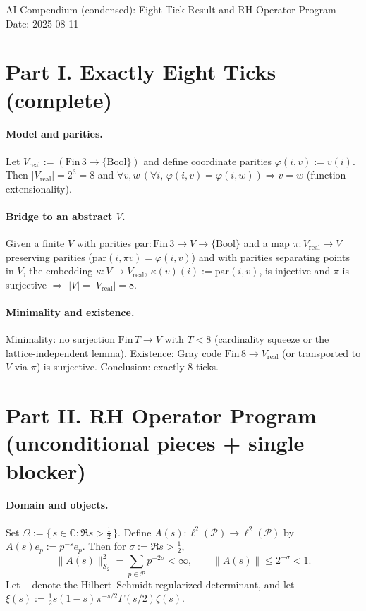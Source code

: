 \documentclass[11pt]{article}
\theoremstyle{remark}
\newcommand{\C}{\mathbb{C}}
\newcommand{\PP}{\mathcal{P}}
\newcommand{\HS}{\mathcal{S}_2}
\newcommand{\Half}{\{\,s\in\C: \Re s>\tfrac12\,\}}
\DeclareMathOperator{\dettwo}{det_2}
\begin{document}
\begin{center}
{\Large AI Compendium (condensed): Eight-Tick Result and RH Operator Program}\\[2mm]
{\small Date: 2025-08-11}
\end{center}

\section*{Part I. Exactly Eight Ticks (complete)}
\paragraph{Model and parities.} Let $V_{\mathrm{real}}:= (\mathrm{Fin}\,3\to \{\text{Bool}\})$ and define coordinate parities $\varphi(i,v):=v(i)$. Then $|V_{\mathrm{real}}|=2^3=8$ and $\forall v,w\,(\forall i,\,\varphi(i,v)=\varphi(i,w))\Rightarrow v=w$ (function extensionality).

\paragraph{Bridge to an abstract $V$.} Given a finite $V$ with parities $\mathrm{par}:\mathrm{Fin}\,3\to V\to \{\text{Bool}\}$ and a map $\pi:V_{\mathrm{real}}\to V$ preserving parities ($\mathrm{par}(i,\pi v)=\varphi(i,v)$) and with parities separating points in $V$, the embedding $\kappa:V\to V_{\mathrm{real}}$, $\kappa(v)(i):=\mathrm{par}(i,v)$, is injective and $\pi$ is surjective $\Rightarrow$ $|V|=|V_{\mathrm{real}}|=8$.

\paragraph{Minimality and existence.} Minimality: no surjection $\mathrm{Fin}\,T\to V$ with $T<8$ (cardinality squeeze or the lattice-independent lemma). Existence: Gray code $\mathrm{Fin}\,8\to V_{\mathrm{real}}$ (or transported to $V$ via $\pi$) is surjective. Conclusion: exactly $8$ ticks.

\section*{Part II. RH Operator Program (unconditional pieces + single blocker)}
\paragraph{Domain and objects.} Set $\Omega:=\Half$. Define $A(s):\ell^2(\PP)\to\ell^2(\PP)$ by $A(s)e_p:=p^{-s}e_p$. Then for $\sigma:=\Re s>\tfrac12$,
\[
\|A(s)\|_{\HS}^2=\sum_{p\in\PP}p^{-2\sigma}<\infty,\qquad \|A(s)\|\le 2^{-\sigma}<1.
\]
Let $\dettwo$ denote the Hilbert--Schmidt regularized determinant, and let $\xi(s):=\tfrac12 s(1-s)\pi^{-s/2}\Gamma(s/2)\zeta(s)$.
\end{document}
